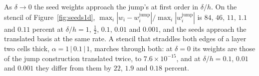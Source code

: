 \documentclass[11pt]{amsart}
\theoremstyle{definition}
\theoremstyle{remark}
\newcommand{\sci}[2]{#1 \times 10^{#2}}
\begin{document}
As $\delta \to 0$ the seed weights approach the jump's at first order in
$\delta / h$. On the stencil of Figure~\ref{fig:seeds1d},
$\max_i |w_i - w_i^{\mathrm{jump}}| / \max_i |w_i^{\mathrm{jump}}|$ is
$84$, $46$, $11$, $1.1$ and $0.11$ percent at $\delta / h = 1$,
$\tfrac12$, $0.1$, $0.01$ and $0.001$, and the seeds approach the
translated basis at the same rate. A stencil that straddles both edges of a
layer two cells thick, $\alpha = 1 \,|\, 0.1 \,|\, 1$, marches through
both: at $\delta = 0$ its weights are those of the jump construction
translated twice, to $\sci{7.6}{-15}$, and at $\delta / h = 0.1$, $0.01$
and $0.001$ they differ from them by $22$, $1.9$ and $0.18$ percent.
\end{document}
